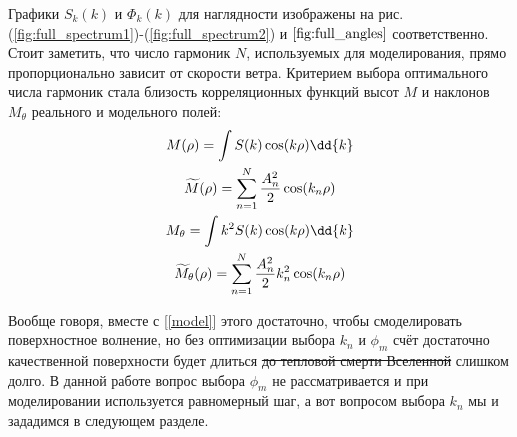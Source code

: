 Графики $S_k(k)$ и $\Phi_k(k)$ для наглядности изображены на рис.(\ref{fig:full_spectrum1})-(\ref{fig:full_spectrum2})  и $\ref{fig:full_angles}$ соответственно. Стоит заметить, что число гармоник $N$, используемых для моделирования, прямо пропорционально зависит от скорости ветра. Критерием выбора оптимального числа гармоник стала близость корреляционных функций высот $M$ и наклонов $M_{\theta}$ реального и модельного полей:
\begin{gather*}
	M(\rho)= \int S(k) \cos(k \rho)\dd{k} \\
	\tM(\rho)= \sum_{n=1}^N \frac{A^2_n}{2}\cos(k_n \rho)\\
	M_{\theta}= \int k^2 S(k)\cos(k \rho) \dd{k} \\
	\tM_{\theta}(\rho)=\sum_{n=1}^N \frac{A_n^2}{2} k_n^2 \cos(k_n \rho)
\end{gather*}





Вообще говоря, вместе с [\ref{model}] этого достаточно, чтобы смоделировать поверхностное волнение, но без оптимизации выбора $k_n$ и $\phi_m$ счёт достаточно качественной поверхности будет длиться \sout{до тепловой смерти Вселенной} слишком долго. В данной работе вопрос выбора $\phi_m$ не рассматривается и при моделировании используется равномерный шаг, а вот вопросом выбора $k_n$ мы и зададимся в следующем разделе. 



